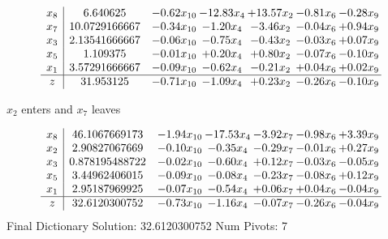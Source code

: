 \documentclass[9pt]{article}
\begin{document}
 \[\begin{array}{c| c c@{\hskip 2pt} c@{\hskip 2pt} c@{\hskip 2pt} c@{\hskip 2pt} c@{\hskip 2pt} }
 x_{8}   &  6.640625 & -0.62 x_{10} & -12.83 x_{4} & + 13.57 x_{2} & -0.81 x_{6} & -0.28 x_{9}\\
 x_{7}   &  10.0729166667 & -0.34 x_{10} & -1.20 x_{4} & -3.46 x_{2} & -0.04 x_{6} & +  0.94 x_{9}\\
 x_{3}   &  2.13541666667 & -0.06 x_{10} & -0.75 x_{4} & -0.43 x_{2} & -0.03 x_{6} & +  0.07 x_{9}\\
 x_{5}   &  1.109375 & -0.01 x_{10} & +  0.20 x_{4} & +  0.80 x_{2} & -0.07 x_{6} & -0.10 x_{9}\\
 x_{1}   &  3.57291666667 & -0.09 x_{10} & -0.62 x_{4} & -0.21 x_{2} & +  0.04 x_{6} & +  0.02 x_{9}\\
\hline
z    &  31.953125 & -0.71 x_{10} & -1.09 x_{4} & +  0.23 x_{2} & -0.26 x_{6} & -0.10 x_{9}\\
\end{array}\]


 $ x_{2} $ enters and $ x_{7} $ leaves 

 \[\begin{array}{c| c c@{\hskip 2pt} c@{\hskip 2pt} c@{\hskip 2pt} c@{\hskip 2pt} c@{\hskip 2pt} }
 x_{8}   &  46.1067669173 & -1.94 x_{10} & -17.53 x_{4} & -3.92 x_{7} & -0.98 x_{6} & +  3.39 x_{9}\\
 x_{2}   &  2.90827067669 & -0.10 x_{10} & -0.35 x_{4} & -0.29 x_{7} & -0.01 x_{6} & +  0.27 x_{9}\\
 x_{3}   &  0.878195488722 & -0.02 x_{10} & -0.60 x_{4} & +  0.12 x_{7} & -0.03 x_{6} & -0.05 x_{9}\\
 x_{5}   &  3.44962406015 & -0.09 x_{10} & -0.08 x_{4} & -0.23 x_{7} & -0.08 x_{6} & +  0.12 x_{9}\\
 x_{1}   &  2.95187969925 & -0.07 x_{10} & -0.54 x_{4} & +  0.06 x_{7} & +  0.04 x_{6} & -0.04 x_{9}\\
\hline
z    &  32.6120300752 & -0.73 x_{10} & -1.16 x_{4} & -0.07 x_{7} & -0.26 x_{6} & -0.04 x_{9}\\
\end{array}\]
Final Dictionary
Solution:  32.6120300752
Num Pivots:  7
\end{document}
